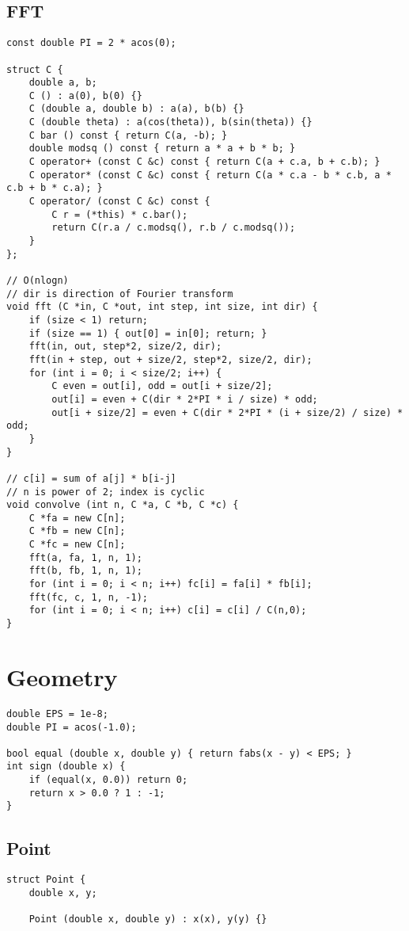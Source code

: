 \documentclass[10pt,landscape]{article}
\begin{document}
\begin{multicols}{2}
\subsection{FFT}
\begin{lstlisting}
const double PI = 2 * acos(0);

struct C {
	double a, b;
	C () : a(0), b(0) {}
	C (double a, double b) : a(a), b(b) {}
	C (double theta) : a(cos(theta)), b(sin(theta)) {}
	C bar () const { return C(a, -b); }
	double modsq () const { return a * a + b * b; }
	C operator+ (const C &c) const { return C(a + c.a, b + c.b); }
	C operator* (const C &c) const { return C(a * c.a - b * c.b, a * c.b + b * c.a); }
	C operator/ (const C &c) const {
		C r = (*this) * c.bar();
		return C(r.a / c.modsq(), r.b / c.modsq());
	}
};

// O(nlogn)
// dir is direction of Fourier transform
void fft (C *in, C *out, int step, int size, int dir) {
	if (size < 1) return;
	if (size == 1) { out[0] = in[0]; return; }
	fft(in, out, step*2, size/2, dir);
	fft(in + step, out + size/2, step*2, size/2, dir);
	for (int i = 0; i < size/2; i++) {
		C even = out[i], odd = out[i + size/2];
		out[i] = even + C(dir * 2*PI * i / size) * odd;
		out[i + size/2] = even + C(dir * 2*PI * (i + size/2) / size) * odd;
	}
}

// c[i] = sum of a[j] * b[i-j]
// n is power of 2; index is cyclic
void convolve (int n, C *a, C *b, C *c) {
	C *fa = new C[n];
	C *fb = new C[n];
	C *fc = new C[n];
	fft(a, fa, 1, n, 1);
	fft(b, fb, 1, n, 1);
	for (int i = 0; i < n; i++) fc[i] = fa[i] * fb[i];
	fft(fc, c, 1, n, -1);
	for (int i = 0; i < n; i++) c[i] = c[i] / C(n,0);
}
\end{lstlisting}
\section{Geometry}
\begin{lstlisting}
double EPS = 1e-8;
double PI = acos(-1.0);

bool equal (double x, double y) { return fabs(x - y) < EPS; }
int sign (double x) {
	if (equal(x, 0.0)) return 0;
	return x > 0.0 ? 1 : -1;
}
\end{lstlisting}
\subsection{Point}
\begin{lstlisting}
struct Point {
	double x, y;

	Point (double x, double y) : x(x), y(y) {}


\end{lstlisting}
\end{multicols}
\end{document}
